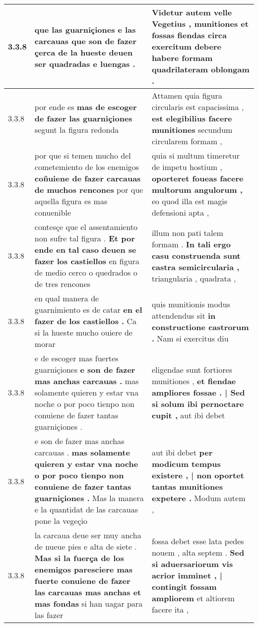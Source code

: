 \begin{tabular}{|p{1cm}|p{6.5cm}|p{6.5cm}|}
3.3.8 & que las guarniçiones e las carcauas \textbf{ que son de fazer çerca de la hueste } deuen ser quadradas e luengas . & Videtur autem velle Vegetius , \textbf{ munitiones et fossas fiendas circa exercitum debere } habere formam quadrilateram oblongam . \\\hline
3.3.8 & por ende es \textbf{ mas de escoger de fazer las guarniçiones } segunt la figura redonda & Attamen quia figura circularis est capacissima , \textbf{ est elegibilius facere munitiones } secundum circularem formam , \\\hline
3.3.8 & por que si temen mucho del cometemiento de los enemigos \textbf{ coñuiene de fazer carcauas de muchos rencones } por que aquella figura es mas conuenible & quia si multum timeretur de impetu hostium , \textbf{ oporteret foueas facere multorum angulorum , } eo quod illa est magis defensioni apta , \\\hline
3.3.8 & contesçe que el assentamiento non sufre tal figura . \textbf{ Et por ende en tal caso deuen se fazer los castiellos } en figura de medio cerco o quedrados o de tres rencones & illum non pati talem formam . \textbf{ In tali ergo casu construenda sunt castra semicircularia , } triangularia , quadrata , \\\hline
3.3.8 & en qual manera de guarnimiento es de catar \textbf{ en el fazer de los castiellos . } Ca si la hueste mucho ouiere de morar & quis munitionis modus attendendus sit \textbf{ in constructione castrorum . } Nam si exercitus diu \\\hline
3.3.8 & e de escoger mas fuertes guarniçiones \textbf{ e son de fazer mas anchas carcauas . } mas solamente quieren y estar vna noche o por poco tienpo non conuiene de fazer tantas guarniçiones . & eligendae sunt fortiores munitiones , \textbf{ et fiendae ampliores fossae . | Sed si solum ibi pernoctare cupit , } aut ibi debet \\\hline
3.3.8 & e son de fazer mas anchas carcauas . \textbf{ mas solamente quieren y estar vna noche o por poco tienpo non conuiene de fazer tantas guarniçiones . } Mas la manera e la quantidat de las carcauas pone la vegeçio & aut ibi debet \textbf{ per modicum tempus existere , | non oportet tantas munitiones expetere . } Modum autem , \\\hline
3.3.8 & la carcaua deue ser muy ancha de nueue pies e alta de siete . \textbf{ Mas si la fuerça de los enemigos paresciere mas fuerte conuiene de fazer las carcauas mas anchas et mas fondas } si han uagar para las fazer & fossa debet esse lata pedes nouem , alta septem . \textbf{ Sed si aduersariorum vis acrior imminet , | contingit fossam ampliorem } et altiorem facere ita , \\\hline

\end{tabular}
